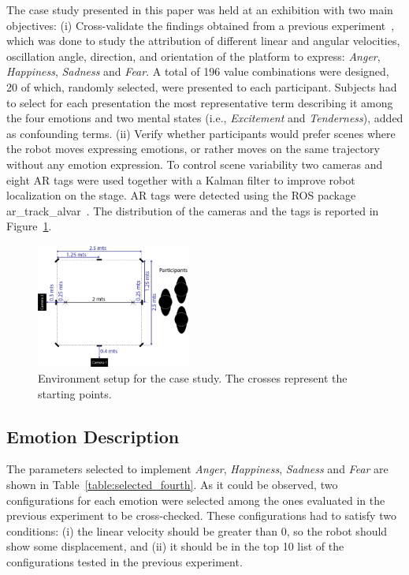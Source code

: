  The case study presented in this paper was held at an exhibition with two main objectives:
 (i) Cross-validate the findings obtained from a previous experiment~\cite{Angel2017-2}, which was done to study the attribution of different linear and angular velocities, oscillation angle, direction, and orientation of the platform to express: \textit{Anger}, \textit{Happiness}, \textit{Sadness} and \textit{Fear}. A total of 196 value combinations were designed, 20 of which, randomly selected, were presented to each participant. Subjects had to select for each presentation the most representative term describing it among the four emotions and two mental states (i.e., \textit{Excitement} and \textit{Tenderness}), added as confounding terms. (ii) Verify whether participants would prefer scenes where the robot moves expressing emotions, or rather moves on the same trajectory without any emotion expression. To control scene variability two cameras and eight AR tags were used together with a Kalman filter to improve robot localization on the stage. AR tags were detected using the ROS package ar\_track\_alvar~\cite{artag2015}. The distribution of the cameras and the tags is reported in Figure~\ref{fig:setup_fourth}. 

\begin{figure}
	\centering
	\includegraphics[width=0.45\textwidth]{./Images/FourthCase.png} 
	\caption{Environment setup for the case study. The crosses represent the starting points.}
	\label{fig:setup_fourth}
\end{figure}

\subsection{Emotion Description}

The parameters selected to implement \textit{Anger}, \textit{Happiness}, \textit{Sadness} and \textit{Fear} are shown in Table~\ref{table:selected_fourth}. As it could be observed, two configurations for each emotion were selected among the ones evaluated in the previous experiment to be cross-checked. These configurations had to satisfy two conditions: (i) the linear velocity should be greater than $0$, so the robot should show some displacement, and (ii) it should be in the top 10 list of the configurations tested in the previous experiment.

